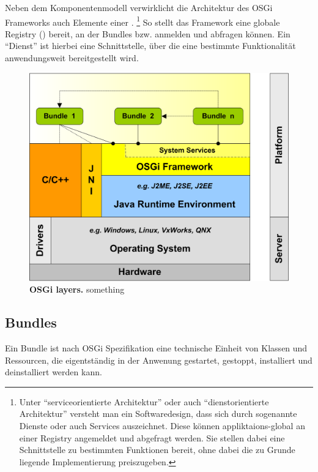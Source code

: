 Neben dem Komponentenmodell verwirklicht die Architektur des OSGi Frameworks
auch Elemente einer .
\footnote{Unter \enquote{serviceorientierte Architektur} oder auch
\enquote{dienstorientierte Architektur} versteht man ein Softwaredesign, dass
sich durch sogenannte Dienste oder auch Services auszeichnet. Diese können
appliktaions-global an einer Registry angemeldet und abgefragt werden.
Sie stellen dabei eine Schnittstelle zu bestimmten Funktionen bereit, ohne
dabei die zu Grunde liegende Implementierung preiszugeben.}
So stellt das Framework eine globale Registry ()
bereit, an der Bundles  bzw.  anmelden und
abfragen können.
Ein \enquote{Dienst} ist hierbei eine Schnittstelle,
über die eine bestimmte Funktionalität anwendungsweit bereitgestellt wird.
\citep{wtherich_die_2008}

\begin{figure}[htbp]
	\begin{center}
		\includegraphics[scale=1.3]{pics/osgi_layer.png}
	\caption[OSGi layers]{
	\textbf{OSGi layers.}
	something}
	\end{center}
	\label{fig:osgi_layer}
\end{figure}

\subsection{Bundles}
Ein Bundle ist nach OSGi Spezifikation\citep{osgi_2009} eine technische Einheit
von Klassen und Ressourcen, die eigentständig in der Anwenung gestartet,
gestoppt, installiert und deinstalliert werden kann.


